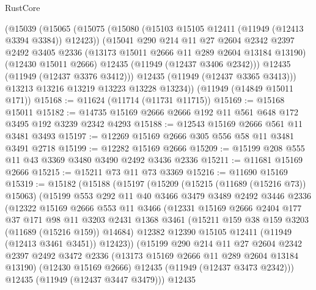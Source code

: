 \begin{lexlean}{RustCore}
\begin{coremodule}
      (@15039
        (@15065
          (@15075
            (@15080 (@15103 @15105 @12411 (@11949 (@12413 @3394 @3384)) @12423))
            (@15041
              @290
              @214
              @11
              @27
              @2604
              @2342
              @2397
              @2492
              @3405
              @2336
              (@13173 @15011 @2666 @11 @289 @2604 @13184 @13190)
              (@12430 @15011 @2666)
              @12435
              (@11949 (@12437 @3406 @2342)))
            @12435
            (@11949 (@12437 @3376 @3412)))
          @12435
          (@11949 (@12437 @3365 @3413)))
        @13213
        @13216
        @13219
        @13223
        @13228
        @13234))
    (@11949 (@14849 @15011 @171))
@15168 := @11624 (@11714 (@11731 @11715))
@15169 := @15168 @15011
@15182 := @14735 @15169 @2666 @2666 @192 @11 @561 @648 @172 @3495 @192 @3239 @2342 @4293
@15188 := @12543 @15169 @2666 @561 @11 @3481 @3493
@15197 := @12269 @15169 @2666 @305 @556 @58 @11 @3481 @3491 @2718
@15199 := @12282 @15169 @2666
@15209 := @15199 @208 @555 @11 @43 @3369 @3480 @3490 @2492 @3436 @2336
@15211 := @11681 @15169 @2666
@15215 := @15211 @73 @11 @73 @3369
@15216 := @11690 @15169
@15319 := @15182
    (@15188
      (@15197
        (@15209
          (@15215 (@11689 (@15216 @73)) @15063)
          (@15199
            @553
            @292
            @11
            @40
            @3466
            @3479
            @3489
            @2492
            @3446
            @2336
            (@12322
              @15169
              @2666
              @553
              @11
              @3466
              (@12331
                @15169
                @2666
                @2404
                @177
                @37
                @171
                @98
                @11
                @3203
                @2431
                @1368
                @3461
                (@15211 @159 @38 @159 @3203 (@11689 (@15216 @159)) @14684)
                @12382
                @12390
                @15105
                @12411
                (@11949 (@12413 @3461 @3451))
                @12423))
            (@15199
              @290
              @214
              @11
              @27
              @2604
              @2342
              @2397
              @2492
              @3472
              @2336
              (@13173 @15169 @2666 @11 @289 @2604 @13184 @13190)
              (@12430 @15169 @2666)
              @12435
              (@11949 (@12437 @3473 @2342)))
            @12435
            (@11949 (@12437 @3447 @3479)))
          @12435

\end{coremodule}
\end{lexlean}
